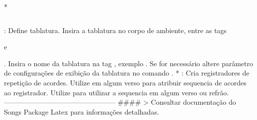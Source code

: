 * \begin{lstlisting}\end{lstlisting} : Define tablatura. Insira a tablatura no corpo de ambiente, entre as tags \begin{} e \end{}. Insira o nome da tablatura na tag \tab{}, exemplo . Se for necessário altere parâmetro de configurações de exibição da tablatura no comando \lstset{basicstyle=\scriptsize\bf}.
*  : Cria registradores de repetição de acordes. Utilize \memorize[nomeAmbRep] em algum verso para atribuir sequencia de acordes ao registrador. Utilize \replay[nomeAmbRep] para utilizar a sequencia em algum verso ou refrão.
------------------------------------------------
#### > Consultar documentação do Songs Package Latex para informações detalhadas.
